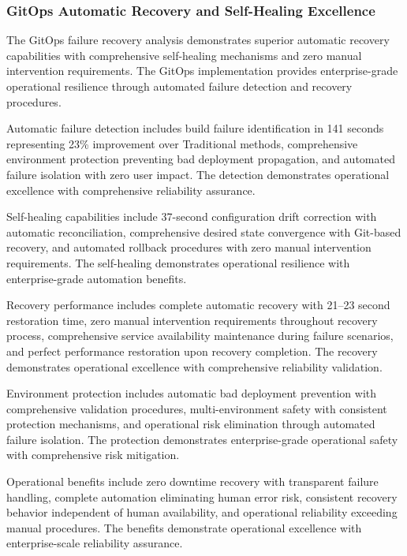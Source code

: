 \subsubsection{GitOps Automatic Recovery and Self-Healing Excellence}

The GitOps failure recovery analysis demonstrates superior automatic recovery capabilities with comprehensive self-healing mechanisms and zero manual intervention requirements. The GitOps implementation provides enterprise-grade operational resilience through automated failure detection and recovery procedures.

Automatic failure detection includes build failure identification in 141 seconds representing 23\% improvement over Traditional methods, comprehensive environment protection preventing bad deployment propagation, and automated failure isolation with zero user impact. The detection demonstrates operational excellence with comprehensive reliability assurance.

Self-healing capabilities include 37-second configuration drift correction with automatic reconciliation, comprehensive desired state convergence with Git-based recovery, and automated rollback procedures with zero manual intervention requirements. The self-healing demonstrates operational resilience with enterprise-grade automation benefits.

Recovery performance includes complete automatic recovery with 21--23 second restoration time, zero manual intervention requirements throughout recovery process, comprehensive service availability maintenance during failure scenarios, and perfect performance restoration upon recovery completion. The recovery demonstrates operational excellence with comprehensive reliability validation.

Environment protection includes automatic bad deployment prevention with comprehensive validation procedures, multi-environment safety with consistent protection mechanisms, and operational risk elimination through automated failure isolation. The protection demonstrates enterprise-grade operational safety with comprehensive risk mitigation.

Operational benefits include zero downtime recovery with transparent failure handling, complete automation eliminating human error risk, consistent recovery behavior independent of human availability, and operational reliability exceeding manual procedures. The benefits demonstrate operational excellence with enterprise-scale reliability assurance.

